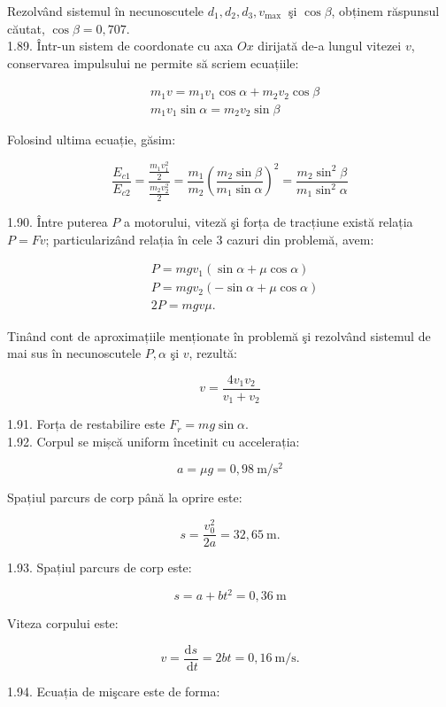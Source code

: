 Rezolvând sistemul în necunoscutele $d_{1}, d_{2}, d_{3}, v_{\text {max }}$ şi $\cos \beta$, obținem răspunsul căutat, $\cos \beta=0,707$.\\
1.89. Într-un sistem de coordonate cu axa $O x$ dirijată de-a lungul vitezei $v$, conservarea impulsului ne permite să scriem ecuațiile:

$$
\begin{aligned}
& m_{1} v=m_{1} v_{1} \cos \alpha+m_{2} v_{2} \cos \beta \\
& m_{1} v_{1} \sin \alpha=m_{2} v_{2} \sin \beta
\end{aligned}
$$

Folosind ultima ecuație, găsim:

$$
\frac{E_{c 1}}{E_{c 2}}=\frac{\frac{m_{1} v_{1}^{2}}{2}}{\frac{m_{2} v_{2}^{2}}{2}}=\frac{m_{1}}{m_{2}}\left(\frac{m_{2} \sin \beta}{m_{1} \sin \alpha}\right)^{2}=\frac{m_{2} \sin ^{2} \beta}{m_{1} \sin ^{2} \alpha}
$$

1.90. Între puterea $P$ a motorului, viteză şi forța de tracțiune există relația $P=F v$; particularizând relația în cele 3 cazuri din problemă, avem:

$$
\begin{aligned}
& P=m g v_{1}(\sin \alpha+\mu \cos \alpha) \\
& P=m g v_{2}(-\sin \alpha+\mu \cos \alpha) \\
& 2 P=m g v \mu .
\end{aligned}
$$

Tinând cont de aproximațiile menționate în problemă şi rezolvând sistemul de mai sus în necunoscutele $P, \alpha$ şi $v$, rezultă:

$$
v=\frac{4 v_{1} v_{2}}{v_{1}+v_{2}}
$$

1.91. Forța de restabilire este $F_{r}=m g \sin \alpha$.\\
1.92. Corpul se mișcă uniform încetinit cu accelerația:

$$
a=\mu g=0,98 \mathrm{~m} / \mathrm{s}^{2}
$$

Spațiul parcurs de corp până la oprire este:

$$
s=\frac{v_{0}^{2}}{2 a}=32,65 \mathrm{~m} .
$$

1.93. Spațiul parcurs de corp este:

$$
s=a+b t^{2}=0,36 \mathrm{~m}
$$

Viteza corpului este:

$$
v=\frac{\mathrm{d} s}{\mathrm{~d} t}=2 b t=0,16 \mathrm{~m} / \mathrm{s} .
$$

1.94. Ecuația de mişcare este de forma:

